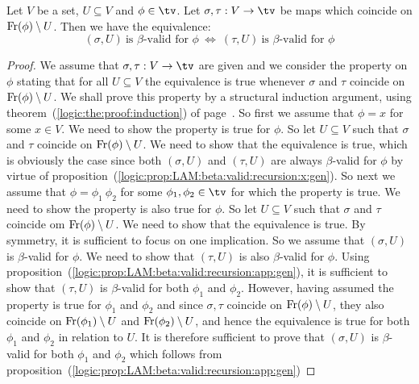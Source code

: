 \begin{prop}\label{logic:prop:LAM:free:support:beta:valid:gen}
    Let $V$ be a set, $U\subseteq V$ and $\phi\in\tv$. Let $\sigma,\tau:V\to\tv$ 
    be maps which coincide on $\mbox{\rm Fr}(\phi)\setminus U$. Then we have the 
    equivalence:
        \[
            (\sigma,U)\ \mbox{is $\beta$-valid for $\phi$}\ 
            \Leftrightarrow\
            (\tau,U)\ \mbox{is $\beta$-valid for $\phi$}
        \]
\end{prop}
\begin{proof}
    We assume that $\sigma,\tau:V\to\tv$ are given and we consider the property 
    on $\phi$ stating that for all $U\subseteq V$ the equivalence is true whenever
    $\sigma$ and $\tau$ coincide on $\mbox{\rm Fr}(\phi)\setminus U$. We shall prove
    this property by a structural induction argument, using 
    theorem~(\ref{logic:the:proof:induction})
    of page~\pageref{logic:the:proof:induction}. So first we assume that $\phi=x$
    for some $x\in V$. We need to show the property is true for $\phi$. So
    let $U\subseteq V$ such that $\sigma$ and $\tau$ coincide on 
    $\mbox{\rm Fr}(\phi)\setminus U$. We need to show that the equivalence is true,
    which is obviously the case since both $(\sigma,U)$ and $(\tau,U)$ are
    always $\beta$-valid for $\phi$ by virtue of 
    proposition~(\ref{logic:prop:LAM:beta:valid:recursion:x:gen}). So next
    we assume that $\phi=\phi_{1}\ \phi_{2}$ for some $\phi_{1},\phi_{2}\in\tv$
    for which the property is true. We need to show the property is also true
    for $\phi$. So let $U\subseteq V$ such that $\sigma$ and $\tau$ coincide
    om $\mbox{\rm Fr}(\phi)\setminus U$. We need to show that the equivalence is true.
    By symmetry, it is sufficient to focus on one implication. So we assume
    that $(\sigma,U)$ is $\beta$-valid for $\phi$. We need to show that 
    $(\tau,U)$ is also $\beta$-valid for $\phi$. Using
    proposition~(\ref{logic:prop:LAM:beta:valid:recursion:app:gen}), it is
    sufficient to show that $(\tau,U)$ is $\beta$-valid for both $\phi_{1}$
    and $\phi_{2}$. However, having assumed the property is true for $\phi_{1}$
    and $\phi_{2}$ and since $\sigma,\tau$ coincide on $\mbox{\rm Fr}(\phi)\setminus U$,
    they also coincide on $\mbox{\rm Fr}(\phi_{1})\setminus U$ and $\mbox{\rm Fr}(\phi_{2})
    \setminus U$, and hence the equivalence is true for both $\phi_{1}$ and 
    $\phi_{2}$ in relation to $U$. It is therefore sufficient to prove that
    $(\sigma,U)$ is $\beta$-valid for both $\phi_{1}$ and $\phi_{2}$ which 
    follows from proposition~(\ref{logic:prop:LAM:beta:valid:recursion:app:gen})

\end{proof}

